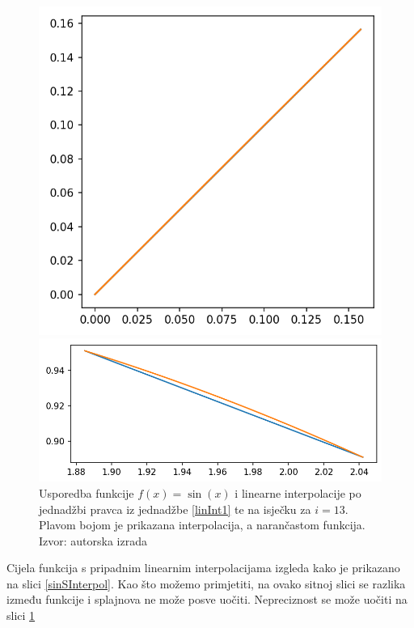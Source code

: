 \documentclass[12pt,a4paper]{report}
\begin{document}
			\begin{figure}[H]
				\centering
				\begin{minipage}{.5\textwidth}
					\centering
					\includegraphics[width=\textwidth]{slike/usporedba40.png}
				\end{minipage}%
				\begin{minipage}{.5\textwidth}
					\centering
					\includegraphics[width=\textwidth]{slike/usporedba412.png}
				\end{minipage}
				\caption{Usporedba funkcije $f(x)=\sin (x)$ i linearne interpolacije po jednadžbi pravca iz jednadžbe \ref{linInt1} te na isječku za $i=13$. Plavom bojom je prikazana interpolacija, a narančastom funkcija. Izvor: autorska izrada}
				\label{linInterSlika1}
			\end{figure}
			Cijela funkcija s pripadnim linearnim interpolacijama izgleda kako je prikazano na slici \ref{sinSInterpol}. Kao što možemo primjetiti, na ovako sitnoj slici se razlika između funkcije i splajnova ne može posve uočiti. Nepreciznost se može uočiti na slici \ref{linInterSlika1}
\end{document}
